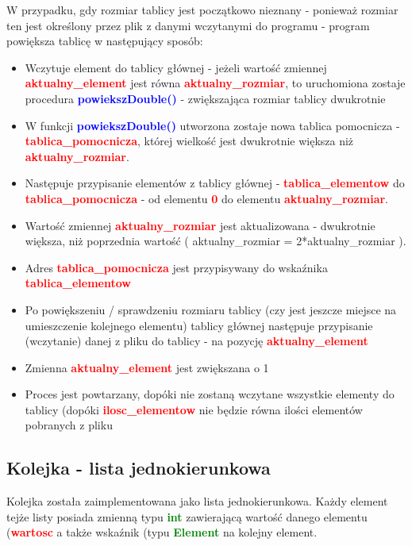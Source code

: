 \documentclass[12pt,a4paper,oneside]{article}
\begin{document}
W przypadku, gdy rozmiar tablicy jest początkowo nieznany - ponieważ rozmiar ten jest określony przez plik z danymi wczytanymi do programu - program powiększa tablicę w następujący sposób:
\begin{itemize}
\item Wczytuje element do tablicy głównej - jeżeli wartość zmiennej \textbf{\textcolor{red}{aktualny\_element}} jest równa \textbf{\textcolor{red}{aktualny\_rozmiar}}, to uruchomiona zostaje procedura \textbf{\textcolor{blue}{powiekszDouble()}} - zwiększająca rozmiar tablicy dwukrotnie
	\item W funkcji \textbf{\textcolor{blue}{powiekszDouble()}} utworzona zostaje nowa tablica pomocnicza -\\ \textbf{\textcolor{red}{tablica\_pomocnicza}}, której wielkość jest dwukrotnie większa niż \textbf{\textcolor{red}{aktualny\_rozmiar}}. 
	\item Następuje przypisanie elementów z tablicy głównej - \textbf{\textcolor{red}{tablica\_elementow}} do\\ \textbf{\textcolor{red}{tablica\_pomocnicza}} - od elementu \textbf{\textcolor{red}{0}} do elementu \textbf{\textcolor{red}{aktualny\_rozmiar}}.
	\item Wartość zmiennej \textbf{\textcolor{red}{aktualny\_rozmiar}} jest aktualizowana - dwukrotnie większa, niż poprzednia wartość ( aktualny\_rozmiar = 2*aktualny\_rozmiar ).
	\item Adres \textbf{\textcolor{red}{tablica\_pomocnicza}} jest przypisywany do wskaźnika \textbf{\textcolor{red}{tablica\_elementow}}
	\item Po powiększeniu / sprawdzeniu rozmiaru tablicy (czy jest jeszcze miejsce na umieszczenie kolejnego elementu) tablicy głównej następuje przypisanie (wczytanie) danej z pliku do tablicy - na pozycję \textbf{\textcolor{red}{aktualny\_element}}
	\item Zmienna \textbf{\textcolor{red}{aktualny\_element}} jest zwiększana o 1
	\item Proces jest powtarzany, dopóki nie zostaną wczytane wszystkie elementy do tablicy (dopóki \textbf{\textcolor{red}{ilosc\_elementow}} nie będzie równa ilości elementów pobranych z pliku
\end{itemize}

\subsection{Kolejka - lista jednokierunkowa}
Kolejka została zaimplementowana jako lista jednokierunkowa. Każdy element tejże listy posiada zmienną typu \textbf{\textcolor{green}{int}} zawierającą wartość danego elementu (\textbf{\textcolor{red}{wartosc}} a także wskaźnik (typu \textbf{\textcolor{green}{Element}} na kolejny element.
\end{document}
